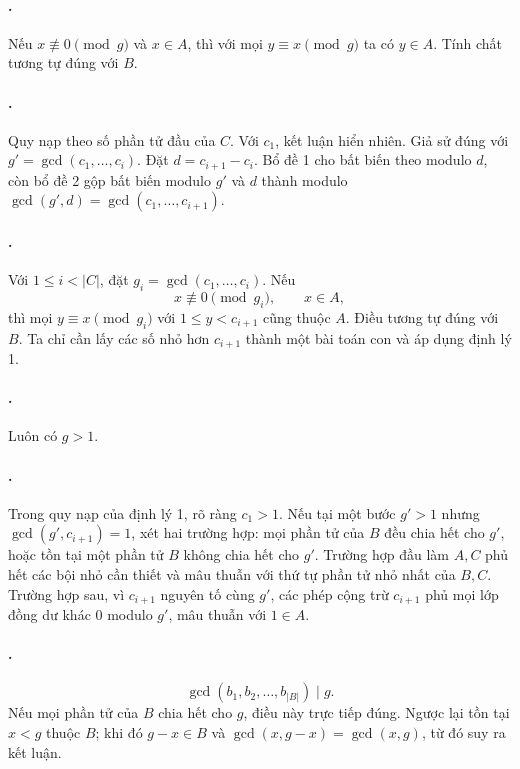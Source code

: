 \documentclass[11pt]{article}
\begin{document}
\paragraph{.}
Nếu \(x\not\equiv 0\pmod g\) và \(x\in A\), thì với mọi \(y\equiv x\pmod g\)
ta có \(y\in A\). Tính chất tương tự đúng với \(B\).

\paragraph{.}
Quy nạp theo số phần tử đầu của \(C\). Với \(c_1\), kết luận hiển nhiên. Giả sử
đúng với \(g'=\gcd(c_1,\ldots,c_i)\). Đặt \(d=c_{i+1}-c_i\). Bổ đề 1 cho bất
biến theo modulo \(d\), còn bổ đề 2 gộp bất biến modulo \(g'\) và \(d\) thành
modulo \(\gcd(g',d)=\gcd(c_1,\ldots,c_{i+1})\).

\paragraph{.}
Với \(1\le i<|C|\), đặt \(g_i=\gcd(c_1,\ldots,c_i)\). Nếu
\[
  x\not\equiv 0\pmod{g_i},\qquad x\in A,
\]
thì mọi \(y\equiv x\pmod{g_i}\) với \(1\le y<c_{i+1}\) cũng thuộc \(A\). Điều
tương tự đúng với \(B\). Ta chỉ cần lấy các số nhỏ hơn \(c_{i+1}\) thành một
bài toán con và áp dụng định lý 1.

\paragraph{.}
Luôn có \(g>1\).

\paragraph{.}
Trong quy nạp của định lý 1, rõ ràng \(c_1>1\). Nếu tại một bước
\(g'>1\) nhưng \(\gcd(g',c_{i+1})=1\), xét hai trường hợp: mọi phần tử của
\(B\) đều chia hết cho \(g'\), hoặc tồn tại một phần tử \(B\) không chia hết cho
\(g'\). Trường hợp đầu làm \(A,C\) phủ hết các bội nhỏ cần thiết và mâu thuẫn
với thứ tự phần tử nhỏ nhất của \(B,C\). Trường hợp sau, vì \(c_{i+1}\) nguyên
tố cùng \(g'\), các phép cộng trừ \(c_{i+1}\) phủ mọi lớp đồng dư khác \(0\)
modulo \(g'\), mâu thuẫn với \(1\in A\).

\paragraph{.}
\[
  \gcd(b_1,b_2,\ldots,b_{|B|}) \mid g.
\]
Nếu mọi phần tử của \(B\) chia hết cho \(g\), điều này trực tiếp đúng. Ngược
lại tồn tại \(x<g\) thuộc \(B\); khi đó \(g-x\in B\) và
\(\gcd(x,g-x)=\gcd(x,g)\), từ đó suy ra kết luận.
\end{document}
